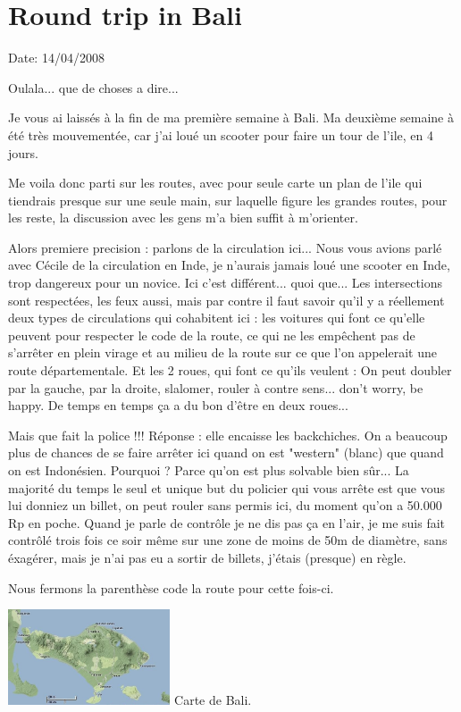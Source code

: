 \section{Round trip in Bali}

Date: 14/04/2008

\begin{multicols}{2}

Oulala... que de choses a dire...

Je vous ai laissés à la fin de ma première semaine à Bali. Ma deuxième semaine à été très mouvementée, car j'ai loué un scooter pour faire un tour de l'ile, en 4 jours.

Me voila donc parti sur les routes, avec pour seule carte un plan de l'ile qui tiendrais presque sur une seule main, sur laquelle figure les grandes routes, pour les reste, la discussion avec les gens m'a bien suffit à m'orienter.

Alors premiere precision : parlons de la circulation ici... Nous vous avions parlé avec Cécile de la circulation en Inde, je n'aurais jamais loué une scooter en Inde, trop dangereux pour un novice. Ici c'est différent... quoi que... Les intersections sont respectées, les feux aussi, mais par contre il faut savoir qu'il y a réellement deux types de circulations qui cohabitent ici : les voitures qui font ce qu'elle peuvent pour respecter le code de la route, ce qui ne les empêchent pas de s'arrêter en plein virage et au milieu de la route sur ce que l'on appelerait une route départementale. Et les 2 roues, qui font ce qu'ils veulent : On peut doubler par la gauche, par la droite, slalomer, rouler à contre sens... don't worry, be happy. De temps en temps ça a du bon d'être en deux roues...

Mais que fait la police !!! Réponse : elle encaisse les backchiches. On a beaucoup plus de chances de se faire arrêter ici quand on est "western" (blanc) que quand on est Indonésien. Pourquoi ? Parce qu'on est plus solvable bien sûr... La majorité du temps le seul et unique but du policier qui vous arrête est que vous lui donniez un billet, on peut rouler sans permis ici, du moment qu'on a 50.000 Rp en poche. Quand je parle de contrôle je ne dis pas ça en l'air, je me suis fait contrôlé trois fois ce soir même sur une zone de moins de 50m de diamètre, sans éxagérer, mais je n'ai pas eu a sortir de billets, j'étais (presque) en règle.

Nous fermons la parenthèse code la route pour cette fois-ci.

\hspace*{-0.65cm}
\includegraphics[width=4.8cm]{articles/Round-trip-in-bali/1208257310r6gK.jpg}
Carte de Bali.



\end{multicols}

